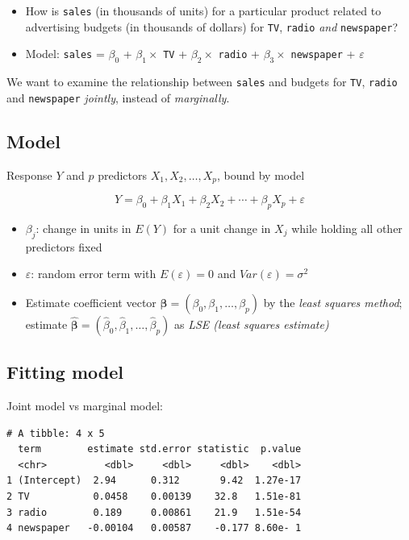 \documentclass[]{article}
\begin{document}
\begin{itemize}
\item
  How is \texttt{sales} (in thousands of units) for a particular product
  related to advertising budgets (in thousands of dollars) for
  \texttt{TV}, \texttt{radio} \emph{and} \texttt{newspaper}?
\item
  Model: \texttt{sales} = \(\beta_0\) + \(\beta_1 \times\) \texttt{TV} +
  \(\beta_2\times\) \texttt{radio} + \(\beta_3 \times\)
  \texttt{newspaper} + \(\varepsilon\)
\end{itemize}

We want to examine the relationship between \texttt{sales} and budgets
for \texttt{TV}, \texttt{radio} and \texttt{newspaper} \emph{jointly},
instead of \emph{marginally}.

\subsection{Model}\label{model}

Response \(Y\) and \(p\) predictors \(X_1, X_2, \ldots, X_p\), bound by
model

\[Y = \beta_0 + \beta_1 X_1 +\beta_2 X_2 + \cdots + \beta_p X_p + \varepsilon\]

\begin{itemize}
\item
  \(\beta_j\): change in units in \(E(Y)\) for a unit change in \(X_j\)
  while holding all other predictors fixed
\item
  \(\varepsilon\): random error term with \(E(\varepsilon)=0\) and
  \(Var(\varepsilon)=\sigma^2\)
\item
  Estimate coefficient vector
  \(\boldsymbol{\beta}=(\beta_0,\beta_1,\ldots,\beta_p)\) by the
  \emph{least squares method}; estimate
  \(\hat{\boldsymbol{\beta}}=(\hat{\beta}_0,\hat{\beta}_1,\ldots,\hat{\beta}_p)\)
  as \emph{LSE (least squares estimate)}
\end{itemize}

\subsection{Fitting model}\label{fitting-model}

Joint model vs marginal model:

\begin{verbatim}
# A tibble: 4 x 5
  term        estimate std.error statistic  p.value
  <chr>          <dbl>     <dbl>     <dbl>    <dbl>
1 (Intercept)  2.94      0.312       9.42  1.27e-17
2 TV           0.0458    0.00139    32.8   1.51e-81
3 radio        0.189     0.00861    21.9   1.51e-54
4 newspaper   -0.00104   0.00587    -0.177 8.60e- 1
\end{verbatim}
\end{document}
